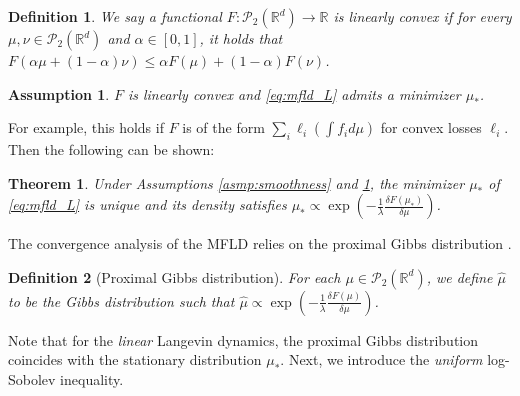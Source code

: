 \documentclass{article}
\newtheorem{theorem}{Theorem}[section]
\newtheorem{definition}{Definition}
\newtheorem{assumption}{Assumption}
\begin{document}
\begin{definition}\label{def:linear_convex}
We say a functional $F:\mathcal{P}_2(\mathbb{R}^d)\to\mathbb{R}$ is linearly convex if for every $\mu,\nu\in\mathcal{P}_2(\mathbb{R}^d)$ and $\alpha\in[0,1]$, it holds that $F(\alpha\mu + (1-\alpha)\nu) \le \alpha F(\mu) + (1-\alpha)F(\nu)$. 
\end{definition}

\begin{assumption}\label{asmp:minimizer}
$F$ is linearly convex and \eqref{eq:mfld_L} admits a minimizer $\mu_*$.
\end{assumption}
For example, this holds if $F$ is of the form $\sum_i \ell_i\left(\int f_i d\mu\right)$ for convex losses $\ell_i$. %
Then the following can be shown:
\begin{theorem}
    Under Assumptions \ref{asmp:smoothness} and \ref{asmp:minimizer}, the minimizer $\mu_*$ of \eqref{eq:mfld_L} is unique and its density satisfies $\mu_* \propto \exp\left(-\frac{1}{\lambda}\frac{\delta F(\mu_*)}{\delta\mu}\right)$.
\end{theorem}


The convergence analysis of the MFLD relies on the proximal Gibbs distribution \citep{nitanda2022convex,chizat2022meanfield}.
\begin{definition}[Proximal Gibbs distribution]\label{def:prox_gibbs}
For each $\mu\in\mathcal{P}_2(\mathbb{R}^d)$, we define $\hat{\mu}$ to be the Gibbs distribution such that $\hat{\mu} \propto \exp\left(-\frac{1}{\lambda}\frac{\delta F(\mu)}{\delta\mu}\right)$.
\end{definition}
Note that for the \emph{linear} Langevin dynamics, the proximal Gibbs distribution coincides with the stationary distribution $\mu_*$. Next, we introduce the \emph{uniform} log-Sobolev inequality. %
\end{document}
